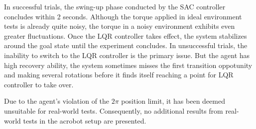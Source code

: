 In successful trials, the swing-up phase conducted by the SAC controller concludes within 2 seconds. Although the torque applied in ideal environment tests is already quite noisy, the torque in a noisy environment exhibits even greater fluctuations. Once the LQR controller takes effect, the system stabilizes around the goal state until the experiment concludes. In unsuccessful trials, the inability to switch to the LQR controller is the primary issue. But the agent has high recovery ability, the system sometimes misses the first transition oppotunity and making several rotations before it finds itself reaching a point for LQR controller to take over.

Due to the agent's violation of the \(2\pi\) position limit, it has been deemed unsuitable for real-world tests. Consequently, no additional results from real-world tests in the acrobot setup are presented.

\cleardoublepage
